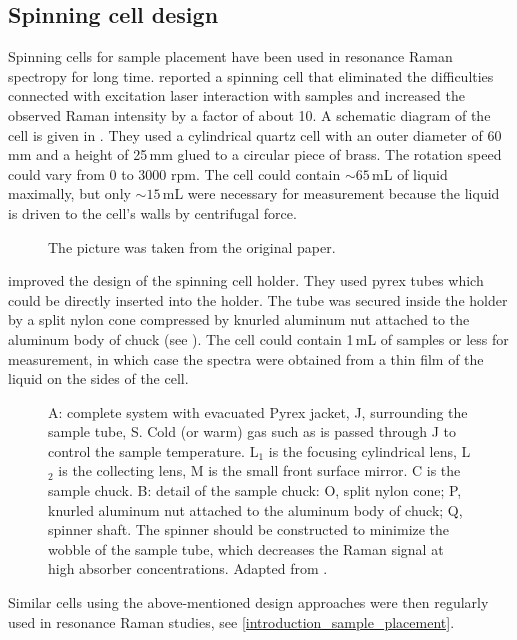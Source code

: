 \subsection{Spinning cell design}
\label{introduction_spinning_cell}

Spinning cells for sample placement have been used in resonance Raman spectropy
for long time.
\textcite{Kiefer1971}
reported a spinning cell that eliminated the difficulties connected with
excitation laser interaction with samples and increased the observed Raman
intensity by a factor of about 10. A schematic diagram of the cell is given in
.
They used a cylindrical quartz cell with an outer diameter of 60\,mm and a
height of 25\,mm glued to a circular piece of brass.
The rotation speed could vary from 0 to 3000 rpm.
The cell could contain $\sim 65$\,mL of liquid maximally, but only
$\sim 15$\,mL were necessary for measurement because the liquid is driven to
the cell's walls by centrifugal force.

\begin{figure}
	\centering
	\caption[%
		Cell for resonance Raman measurements in liquids.%
	]{%
		The picture was taken from the original paper.
	}
	\label{\figlabel{introduction_spinning_cell:1971Kiefer_rotating_cell}}
\end{figure}

\textcite{Shriver1974} improved the design of the spinning cell holder.
They used pyrex tubes which could be directly inserted into the holder.
The tube was secured inside the holder by a split nylon cone compressed by
knurled aluminum nut attached to the aluminum body of chuck (see
).
The cell could contain 1\,mL of samples or less for measurement, in which case
the spectra were obtained from a thin film of the liquid on the sides of the
cell.

\begin{figure}
	\centering
	\caption[%
		Detail of sample spinner, for 180\textdegree{} or oblique illumination.%
	]{%
		A: complete system with evacuated Pyrex jacket, J,
			surrounding the sample tube, S.
			Cold (or warm) gas such as  is passed through J to control the
			sample temperature.
			L$_1$ is the focusing cylindrical lens,
			L$_2$ is the collecting lens,
			M is the small front surface mirror.
			C is the sample chuck.
		B: detail of the sample chuck:
			O, split nylon cone;
			P, knurled aluminum nut attached to the aluminum body of chuck;
			Q, spinner shaft.
		The spinner should be constructed to minimize the wobble of the sample
		tube, which decreases the Raman signal at high absorber concentrations.
		Adapted from \textcite{Shriver1974}.%
	}
	\label{\figlabel{introduction_spinning_cell:1971Kiefer_rotating_cell}}
\end{figure}

Similar cells using the above-mentioned design approaches were then regularly
used in resonance Raman studies, see
\cref{introduction_sample_placement}.
